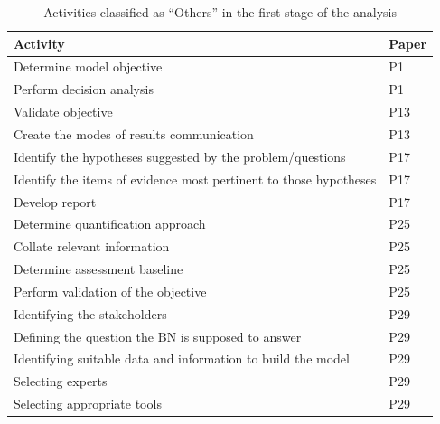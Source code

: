 \begin{table}[t]
\caption{Activities classified as ``Others'' in the first stage of the analysis}
\label{tab:map_stage1_others}
\centering
\small
\renewcommand{\arraystretch}{1.2}
\setlength{\tabcolsep}{8pt}

\begin{tabularx}{0.70\linewidth}{>{\raggedright\arraybackslash}X
                              >{\centering\arraybackslash}p{1.2cm}}
\toprule
\textbf{Activity} & \textbf{Paper} \\
\midrule
Determine model objective & P1 \\
Perform decision analysis & P1 \\
Validate objective & P13 \\
Create the modes of results communication & P13 \\
Identify the hypotheses suggested by the problem/questions & P17 \\
Identify the items of evidence most pertinent to those hypotheses & P17 \\
Develop report & P17 \\
Determine quantification approach & P25 \\
Collate relevant information & P25 \\
Determine assessment baseline & P25 \\
Perform validation of the objective & P25 \\
Identifying the stakeholders & P29 \\
Defining the question the BN is supposed to answer & P29 \\
Identifying suitable data and information to build the model & P29 \\
Selecting experts & P29 \\
Selecting appropriate tools & P29 \\
\bottomrule
\end{tabularx}
\end{table}


